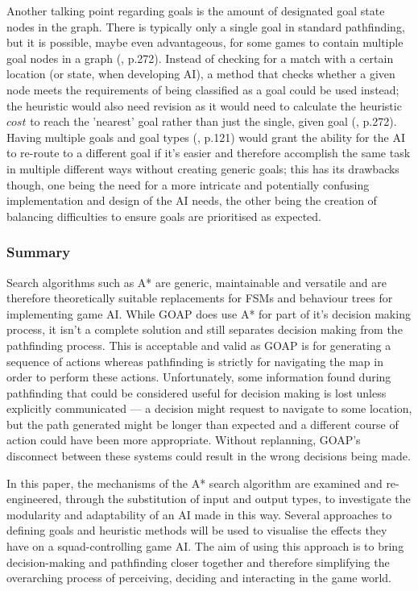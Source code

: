 \documentclass[11pt, a4paper]{article}
\begin{document}
Another talking point regarding goals is the amount of designated goal state nodes in the graph. There is typically only a single goal in standard pathfinding, but it is possible, maybe even advantageous, for some games to contain multiple goal nodes in a graph (\cite{millington2019ai}, p.272). Instead of checking for a match with a certain location (or state, when developing AI), a method that checks whether a given node meets the requirements of being classified as a goal could be used instead; the heuristic would also need revision as it would need to calculate the heuristic $cost$ to reach the 'nearest' goal rather than just the single, given goal (\cite{millington2019ai}, p.272). Having multiple goals and goal types (\cite{higgins2002generic}, p.121) would grant the ability for the AI to re-route to a different goal if it's easier and therefore accomplish the same task in multiple different ways without creating generic goals; this has its drawbacks though, one being the need for a more intricate and potentially confusing implementation and design of the AI needs, the other being the creation of balancing difficulties to ensure goals are prioritised as expected.

\subsubsection{Summary}

Search algorithms such as A* are generic, maintainable and versatile and are therefore theoretically suitable replacements for FSMs and behaviour trees for implementing game AI. While GOAP does use A* for part of it's decision making process, it isn't a complete solution and still separates decision making from the pathfinding process. This is acceptable and valid as GOAP is for generating a sequence of actions whereas pathfinding is strictly for navigating the map in order to perform these actions. Unfortunately, some information found during pathfinding that could be considered useful for decision making is lost unless explicitly communicated --- a decision might request to navigate to some location, but the path generated might be longer than expected and a different course of action could have been more appropriate. Without replanning, GOAP's disconnect between these systems could result in the wrong decisions being made.

In this paper, the mechanisms of the A* search algorithm are examined and re-engineered, through the substitution of input and output types, to investigate the modularity and adaptability of an AI made in this way. Several approaches to defining goals and heuristic methods will be used to visualise the effects they have on a squad-controlling game AI. The aim of using this approach is to bring decision-making and pathfinding closer together and therefore simplifying the overarching process of perceiving, deciding and interacting in the game world.
\end{document}
